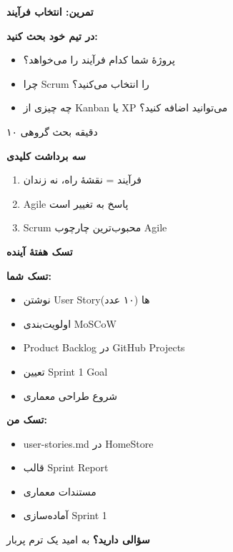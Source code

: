 \documentclass[14pt, a4paper, landscape]{extarticle}
\newcommand{\slide}[1]{%
    \newpage
    \begin{center}
    \begin{minipage}[t]{0.95\textwidth}
    \vspace{0.5cm}
    #1
    \vspace{0.5cm}
    \end{minipage}
    \end{center}
}
\newcommand{\slidetitle}[1]{%
    \begin{center}
        {\LARGE\bfseries\textcolor{primary}{#1}}
    \end{center}
    \vspace{0.5cm}
}
\newcommand{\myaccent}[1]{\textcolor{accent}{#1}}
\begin{document}
\slide{
    \slidetitle{تمرین: انتخاب فرآیند}
    \vspace{1cm}
    \begin{center}
        {\Large\bfseries در تیم خود بحث کنید:}
    \end{center}
    \vspace{1cm}
    \begin{itemize}[itemsep=0.5em]
        \item {\large پروژهٔ شما کدام فرآیند را می‌خواهد؟}
        \item {\large چرا Scrum را انتخاب می‌کنید؟}
        \item {\large چه چیزی از Kanban یا XP می‌توانید اضافه کنید؟}
    \end{itemize}
    \vspace{1cm}
    \begin{center}
        {\myaccent{۱۰ دقیقه بحث گروهی}}
    \end{center}
}

\slide{
    \slidetitle{سه برداشت کلیدی}
    \vspace{1cm}
    \begin{enumerate}[itemsep=0.8em]
        \item {\large فرآیند = نقشهٔ راه، نه زندان}
        \item {\large Agile پاسخ به تغییر است}
        \item {\large Scrum محبوب‌ترین چارچوب Agile}
    \end{enumerate}
}

\slide{
    \slidetitle{تسک هفتهٔ آینده}
    \vspace{0.5cm}
    \begin{minipage}[t]{0.48\textwidth}
        {\bfseries\textcolor{primary}{تسک شما:}}
        \vspace{0.3cm}
        \begin{itemize}[itemsep=0.3em]
            \item نوشتن User Storyها (۱۰ عدد)
            \item اولویت‌بندی MoSCoW
            \item Product Backlog در GitHub Projects
            \item تعیین Sprint 1 Goal
            \item شروع طراحی معماری
        \end{itemize}
    \end{minipage}
    \hfill
    \begin{minipage}[t]{0.48\textwidth}
        {\bfseries\myaccent{تسک من:}}
        \vspace{0.3cm}
        \begin{itemize}[itemsep=0.3em]
            \item user-stories.md در HomeStore
            \item قالب Sprint Report
            \item مستندات معماری
            \item آماده‌سازی Sprint 1
        \end{itemize}
    \end{minipage}
}

\slide{
    \begin{center}
        \vspace{3cm}
        {\Huge\bfseries سؤالی دارید؟}
        \vspace{1.5cm}
        {\LARGE\myaccent{به امید یک ترم پربار}}
    \end{center}
}
\end{document}
